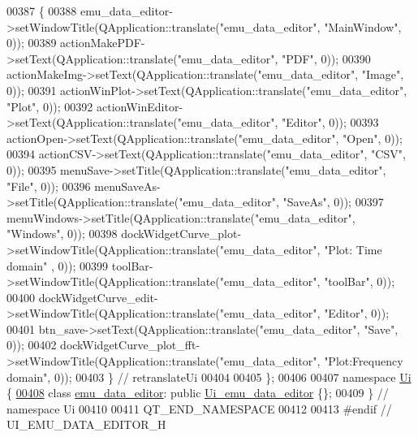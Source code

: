 \begin{DoxyCode}
00387     \{
00388         emu\_data\_editor->setWindowTitle(QApplication::translate(\textcolor{stringliteral}{"emu\_data\_editor"}, \textcolor{stringliteral}{"MainWindow"}, 0));
00389         actionMakePDF->setText(QApplication::translate(\textcolor{stringliteral}{"emu\_data\_editor"}, \textcolor{stringliteral}{"PDF"}, 0));
00390         actionMakeImg->setText(QApplication::translate(\textcolor{stringliteral}{"emu\_data\_editor"}, \textcolor{stringliteral}{"Image"}, 0));
00391         actionWinPlot->setText(QApplication::translate(\textcolor{stringliteral}{"emu\_data\_editor"}, \textcolor{stringliteral}{"Plot"}, 0));
00392         actionWinEditor->setText(QApplication::translate(\textcolor{stringliteral}{"emu\_data\_editor"}, \textcolor{stringliteral}{"Editor"}, 0));
00393         actionOpen->setText(QApplication::translate(\textcolor{stringliteral}{"emu\_data\_editor"}, \textcolor{stringliteral}{"Open"}, 0));
00394         actionCSV->setText(QApplication::translate(\textcolor{stringliteral}{"emu\_data\_editor"}, \textcolor{stringliteral}{"CSV"}, 0));
00395         menuSave->setTitle(QApplication::translate(\textcolor{stringliteral}{"emu\_data\_editor"}, \textcolor{stringliteral}{"File"}, 0));
00396         menuSaveAs->setTitle(QApplication::translate(\textcolor{stringliteral}{"emu\_data\_editor"}, \textcolor{stringliteral}{"SaveAs"}, 0));
00397         menuWindows->setTitle(QApplication::translate(\textcolor{stringliteral}{"emu\_data\_editor"}, \textcolor{stringliteral}{"Windows"}, 0));
00398         dockWidgetCurve\_plot->setWindowTitle(QApplication::translate(\textcolor{stringliteral}{"emu\_data\_editor"}, \textcolor{stringliteral}{"Plot: Time domain"}
      , 0));
00399         toolBar->setWindowTitle(QApplication::translate(\textcolor{stringliteral}{"emu\_data\_editor"}, \textcolor{stringliteral}{"toolBar"}, 0));
00400         dockWidgetCurve\_edit->setWindowTitle(QApplication::translate(\textcolor{stringliteral}{"emu\_data\_editor"}, \textcolor{stringliteral}{"Editor"}, 0));
00401         btn\_save->setText(QApplication::translate(\textcolor{stringliteral}{"emu\_data\_editor"}, \textcolor{stringliteral}{"Save"}, 0));
00402         dockWidgetCurve\_plot\_fft->setWindowTitle(QApplication::translate(\textcolor{stringliteral}{"emu\_data\_editor"}, \textcolor{stringliteral}{"Plot:Frequency
       domain"}, 0));
00403     \} \textcolor{comment}{// retranslateUi}
00404 
00405 \};
00406 
00407 \textcolor{keyword}{namespace }\hyperlink{a00055}{Ui} \{
\hypertarget{a00051_source_l00408}{}\hyperlink{a00005}{00408}     \textcolor{keyword}{class }\hyperlink{a00005}{emu\_data\_editor}: \textcolor{keyword}{public} \hyperlink{a00026}{Ui\_emu\_data\_editor} \{\};
00409 \} \textcolor{comment}{// namespace Ui}
00410 
00411 QT\_END\_NAMESPACE
00412 
00413 \textcolor{preprocessor}{#endif // UI\_EMU\_DATA\_EDITOR\_H}
\end{DoxyCode}
